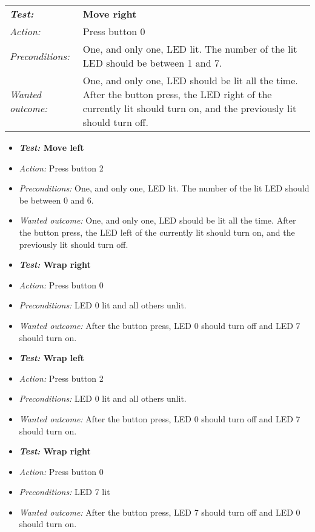 \begin{tabular}[h]{lp{12cm}} \hline
\textbf{\emph{Test:}} 	& \textbf{Move right}\\
\emph{Action:} 		& Press button 0\\
\emph{Preconditions:}	& One, and only one, LED lit. The number of the lit LED should be between 1 and 7.\\
\emph{Wanted outcome:}	& One, and only one, LED should be lit all the time. After the button press, the LED right of the currently lit should turn on, and the previously lit should turn off.\\ \hline
\end{tabular}
\begin{itemize}
\item \textbf{\emph{Test:} Move left}
\item \emph{Action:} Press button 2
\item \emph{Preconditions:} One, and only one, LED lit. The number of the lit LED should be between 0 and 6.
\item \emph{Wanted outcome:} One, and only one, LED should be lit all the time. After the button press, the LED left of the currently lit should turn on, and the previously lit should turn off.
\end{itemize}
\begin{itemize}
\item \textbf{\emph{Test:} Wrap right}
\item \emph{Action:} Press button 0
\item \emph{Preconditions:} LED 0 lit and all others unlit.
\item \emph{Wanted outcome:} After the button press, LED 0 should turn off and LED 7 should turn on.
\end{itemize}
\begin{itemize}
\item \textbf{\emph{Test:} Wrap left}
\item \emph{Action:} Press button 2
\item \emph{Preconditions:} LED 0 lit and all others unlit.
\item \emph{Wanted outcome:} After the button press, LED 0 should turn off and LED 7 should turn on.
\end{itemize}
\begin{itemize}
\item \textbf{\emph{Test:} Wrap right}
\item \emph{Action:} Press button 0
\item \emph{Preconditions:} LED 7 lit
\item \emph{Wanted outcome:} After the button press, LED 7 should turn off and LED 0 should turn on.

\end{itemize}
